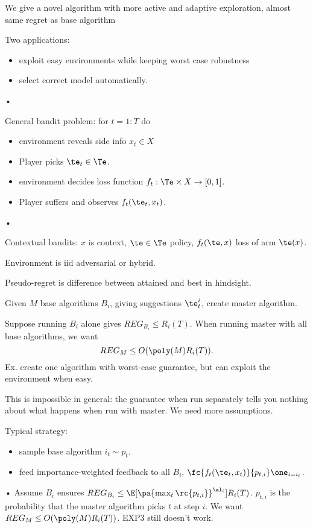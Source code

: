 We give a novel algorithm with more active and adaptive exploration, almost same regret as base algorithm

Two applications:
\begin{itemize}
\item
exploit easy environments while keeping worst case robustness
\item
select correct model automatically.
\end{itemize}•

General bandit problem: for $t=1:T$ do
\begin{itemize}
\item
environment reveals side info $x_t\in X$
\item
Player picks $\te_t\in \Te$.
\item
environment decides loss function $f_t:\Te\times X\to [0,1]$.
\item
Player suffers and observes $f_t(\te_t,x_t)$.
\end{itemize}•

Contextual bandits: $x$ is context, $\te\in \Te$ policy, $f_t(\te, x)$ loss of arm $\te(x)$. 

Environment is iid adversarial or hybrid.

Pseudo-regret is difference between attained and best in hindsight.

Given $M$ base algorithms $B_i$, giving suggestions $\te_t^i$, create master algorithm.

Suppose running $B_i$ alone gives $REG_{B_i}\le R_i(T)$. When running master with all base algorithms, we want
$$
REG_M\le O(\poly(M)R_i(T)).
$$
Ex. %
create one algorithm with worst-case guarantee, but can exploit the environment when easy.

This is impossible in general: the guarantee when run separately tells you nothing about what happens when run with master. We need more assumptions.

Typical strategy:
\begin{itemize}
\item
sample base algorithm $i_t\sim p_t$.
\item
feed importance-weighted feedback to all $B_i$, $\fc{f_t(\te_t,x_t)}{p_{t,i}} \one_{i=i_t}$. 
\end{itemize}•
Assume $B_i$ ensures $REG_{B_i} \le \E[\pa{\max_t\rc{p_{t,i}}}^{\al_i}]R_i(T)$. $p_{t,i}$ is the probability that the master algorithm picks $t$ at step $i$.
We want $REG_M\le O(\poly(M)R_i(T))$. EXP3 still doesn't work.


